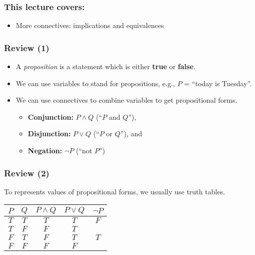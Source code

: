 

\begin{frame}\frametitle{This lecture covers:}
  \begin{itemize}
  \item More connectives: implications and equivalences
  \end{itemize}
\end{frame}

\begin{frame}\frametitle{Review (1)}
  \begin{itemize}
  \item A {\em proposition} is a statement which is either {\bf true}
    or {\bf false}.
  \item We can use variables to stand for propositions, e.g., $P$ =
    ``today is Tuesday''.
  \item We can use connectives to combine variables to get
    propositional forms.
    \begin{itemize}
    \item {\bf Conjunction:} $P\wedge Q$ (``$P$ and $Q$''), 
    \item {\bf Disjunction:} $P\vee Q$ (``$P$ or $Q$''), and
    \item {\bf Negation:} $\neg P$ (``not $P$'') 
    \end{itemize}
  \end{itemize}
\end{frame}

\begin{frame}\frametitle{Review (2)}
  To represents values of propositional forms, we usually use truth tables.
  \begin{tcolorbox}[title=And/Or/Not]
    \begin{tabular}{|c|c||c|c|c|}
      \hline
      $P$ & $Q$ & $P\wedge Q$ & $P\vee Q$ & $\neg P$ \\
      \hline
      $T$ & $T$ & $T$ & $T$ & $F$ \\
      $T$ & $F$ & $F$ & $T$ & \\
      $F$ & $T$ & $F$ & $T$ & $T$ \\
      $F$ & $F$ & $F$ & $F$ & \\
      \hline
    \end{tabular}
  \end{tcolorbox}
\end{frame}

